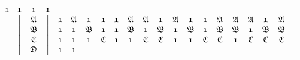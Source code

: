 \documentclass[final,12pt,a4paper,twoside,fleqn]{extbook}
\theoremstyle{definition}
\theoremstyle{remark}
\begin{document}
\begin{equation}
\begin{array}{@{}*{22}c@{}}
      {\mathfrak{1}}&%
      {\mathfrak{1}}&%
      {\mathfrak{1}}&%
      {\mathfrak{1}}&%
      \big\vert        %
      \\ \nonumber
      {}            &%
      \big\vert       &%
      {\mathfrak{A}}&%
      \big\vert       &%
      {\mathfrak{1}}&%
      {\mathfrak{A}}&%
      {\mathfrak{1}}&%
      {\mathfrak{1}}&%
      {\mathfrak{1}}&%
      {\mathfrak{A}}&%
      {\mathfrak{A}}&%
      {\mathfrak{1}}&%
      {\mathfrak{A}}&%
      {\mathfrak{1}}&%
      {\mathfrak{1}}&%
      {\mathfrak{A}}&%
      {\mathfrak{A}}&%
      {\mathfrak{A}}&%
      {\mathfrak{1}}&%
      {\mathfrak{A}}&%
      \big\vert        %
      \\ \nonumber
      {}            &%
      \big\vert       &%
      {\mathfrak{B}}&%
      \big\vert       &%
      {\mathfrak{1}}&%
      {\mathfrak{1}}&%
      {\mathfrak{B}}&%
      {\mathfrak{1}}&%
      {\mathfrak{1}}&%
      {\mathfrak{B}}&%
      {\mathfrak{1}}&%
      {\mathfrak{B}}&%
      {\mathfrak{1}}&%
      {\mathfrak{B}}&%
      {\mathfrak{1}}&%
      {\mathfrak{B}}&%
      {\mathfrak{B}}&%
      {\mathfrak{1}}&%
      {\mathfrak{B}}&%
      {\mathfrak{B}}&%
      \big\vert        %
      \\ \nonumber
      {}             &%
      \big\vert        &%
      {\mathfrak{C}} &%
      \big\vert        &%
      {\mathfrak{1}} &%
      {\mathfrak{1}} &%
      {\mathfrak{1}} &%
      {\mathfrak{C}} &%
      {\mathfrak{1}} &%
      {\mathfrak{1}} &%
      {\mathfrak{C}} &%
      {\mathfrak{C}} &%
      {\mathfrak{1}} &%
      {\mathfrak{1}} &%
      {\mathfrak{C}} &%
      {\mathfrak{C}} &%
      {\mathfrak{1}} &%
      {\mathfrak{C}} &%
      {\mathfrak{C}} &%
      {\mathfrak{C}} &%
      \big\vert         %
      \\ \nonumber
      {}             &%
      \big\vert        &%
      {\mathfrak{D}} &%
      \big\vert        &%
      {\mathfrak{1}} &%
      {\mathfrak{1}} &%

\end{array}
\end{equation}
\end{document}
